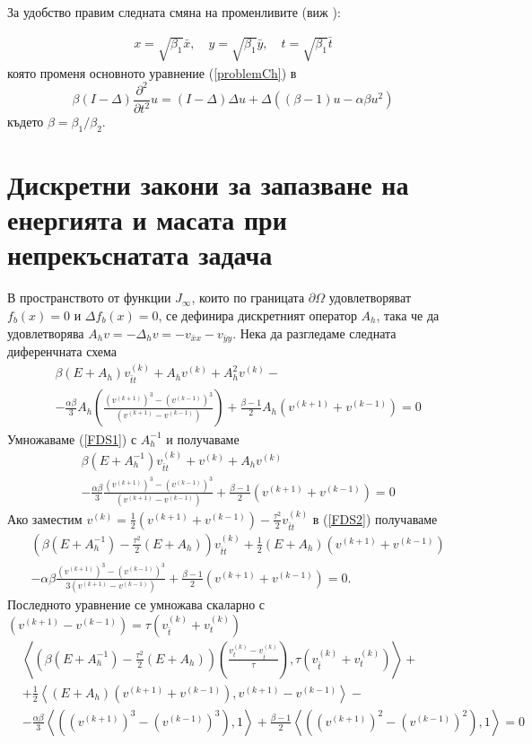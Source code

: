 \documentclass{article}
\newcommand{\be}{\begin{equation}}
\newcommand{\ee}{\end{equation}}
\newcommand{\rf}[1]{(\ref{#1})}
\begin{document}
За удобство правим следната смяна на променливите (виж \cite{ref25}):

\begin{align}
x = \sqrt{\beta_1} \bar{x}, \quad y = \sqrt{\beta_1} \bar{y}, \quad t = \sqrt{\beta_1} \bar{t} \nonumber
\end{align}
която променя основното уравнение \rf{problemCh} в
\be\label{problemVC}
 \beta (I-\Delta) \frac{\partial^2}{\partial t^2}u= 
(I-\Delta)\Delta u +\Delta( (\beta - 1 )u - \alpha \beta u^2 )
\ee
където $\beta = \beta_1/\beta_2$. 

\section{Дискретни закони за запазване на енергията и масата при непрекъснатата задача}
В пространството от функции $J_\infty$, които по границата $\partial\Omega$ удовлетворяват $f_b(x) = 0$ и $\Delta f_b(x) = 0$, се дефинира дискретният оператор $A_h$, така че да удовлетворява $A_h v=-\Delta_h v=-v_{\bar{x}x} - v_{\bar{y}y}$. Нека да разгледаме следната диференчната схема
\begin{align}\label{FDS1}
&\beta (E+A_h)v_{\bar{t}t}^{(k)} + A_hv^{(k)}+A_h^2 v^{(k)} -\nonumber\\
&-\frac{\alpha \beta}{3} A_h\left(\frac{(v^{(k+1)})^3-(v^{(k-1)})^3}{(v^{(k+1)}-v^{(k-1)})} \right) + \frac{\beta - 1}{2}A_h\left( v^{(k+1)}+v^{(k-1)} \right) =0
\end{align}
Умножаваме \rf{FDS1} с $A_h^{-1}$ и получаваме
\begin{align}\label{FDS2}
&\beta (E+A_h^{-1})v_{\bar{t}t}^{(k)} + v^{(k)}+A_h v^{(k)} \nonumber\\
&-\frac{\alpha \beta}{3} \frac{(v^{(k+1)})^3-(v^{(k-1)})^3}{(v^{(k+1)}-v^{(k-1)})} + \frac{\beta - 1}{2}\left( v^{(k+1)} + v^{(k-1)} \right)= 0
\end{align}
Ако заместим $v^{(k)}=\frac{1}{2}(v^{(k+1)}+v^{(k-1)})-\frac{\tau^2}{2}v_{\bar{t}t}^{(k)}$ в \rf{FDS2} получаваме
\begin{align*}
&\left( \beta (E+A_h^{-1})- \frac{\tau^2}{2}(E+A_h ) \right)v_{\bar{t}t}^{(k)}  + \frac{1}{2} (E +A_h )(v^{(k+1)}+v^{(k-1)}) \\
&-\alpha \beta \frac{(v^{(k+1)})^3-(v^{(k-1)})^3}{3(v^{(k+1)}-v^{(k-1)})} + \frac{\beta - 1}{2}\left( v^{(k+1)}+v^{(k-1)} \right) = 0.
\end{align*}
Последното уравнение се умножава скаларно с $(v^{(k+1)}-v^{(k-1)})=\tau (v_{\bar{t}}^{(k)} + v_{t}^{(k)})$
\begin{align*}
&\left< \left( \beta (E+A_h^{-1})- \frac{\tau^2}{2}( E+A_h ) \right) \left( \frac{v_{t}^{(k)} - v_{\bar t}^{(k)}}{\tau}   \right ), \tau (v_{\bar{t}}^{(k)} + v_{t}^{(k)}) \right>  + \\
& +\frac{1}{2} \left<  (E +A_h ) \left( v^{(k+1)} + v^{(k-1)} \right ) , v^{(k+1)} - v^{(k-1)} \right> - \\
&- \frac{\alpha \beta}{3} \left< \left( (v^{(k+1)})^3-(v^{(k-1)})^3 \right), 1 \right> + \frac{\beta - 1}{2} \left< \left( (v^{(k+1)})^2-(v^{(k-1)})^2 \right), 1 \right> =0
\end{align*}
\end{document}
